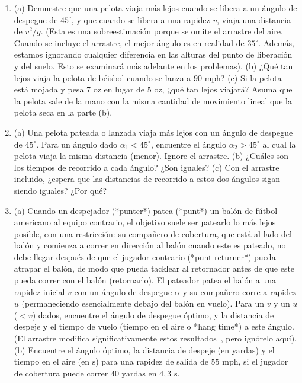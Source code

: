 \documentclass[12pt]{book}
\begin{document}
\begin{enumerate}
\item[3.93] (a) Demuestre que una pelota viaja más lejos cuando se libera a un ángulo de despegue de $45^\circ$, y que cuando se libera a una rapidez $v$, viaja una distancia de $v^2/g$. (Esta es una sobreestimación porque se omite el arrastre del aire. Cuando se incluye el arrastre, el mejor ángulo es en realidad de $35^\circ$. Además, estamos ignorando cualquier diferencia en las alturas del punto de liberación y del suelo. Esto se examinará más adelante en los problemas).
\newline
(b) ¿Qué tan lejos viaja la pelota de béisbol cuando se lanza a $90\text{ mph}$?
\newline
(c) Si la pelota está mojada y pesa $7\text{ oz}$ en lugar de $5\text{ oz}$, ¿qué tan lejos viajará? Asuma que la pelota sale de la mano con la misma cantidad de movimiento lineal que la pelota seca en la parte (b).

\item[3.94] (a) Una pelota pateada o lanzada viaja más lejos con un ángulo de despegue de $45^\circ$. Para un ángulo dado $\alpha_1 < 45^\circ$, encuentre el ángulo $\alpha_2 > 45^\circ$ al cual la pelota viaja la misma distancia (menor). Ignore el arrastre.
\newline
(b) ¿Cuáles son los tiempos de recorrido a cada ángulo? ¿Son iguales?
\newline
(c) Con el arrastre incluido, ¿espera que las distancias de recorrido a estos dos ángulos sigan siendo iguales? ¿Por qué?

\item[3.95] (a) Cuando un despejador (*punter*) patea (*punt*) un balón de fútbol americano al equipo contrario, el objetivo suele ser patearlo lo más lejos posible, con una restricción: su compañero de cobertura, que está al lado del balón y comienza a correr en dirección al balón cuando este es pateado, no debe llegar después de que el jugador contrario (*punt returner*) pueda atrapar el balón, de modo que pueda tacklear al retornador antes de que este pueda correr con el balón (retornarlo). El pateador patea el balón a una rapidez inicial $v$ con un ángulo de despegue $\alpha$ y su compañero corre a rapidez $u$ (permaneciendo esencialmente debajo del balón en vuelo). Para un $v$ y un $u$ ($< v$) dados, encuentre el ángulo de despegue óptimo, y la distancia de despeje y el tiempo de vuelo (tiempo en el aire o *hang time*) a este ángulo. (El arrastre modifica significativamente estos resultados~\cite{ref16}, pero ignórelo aquí).
\newline
(b) Encuentre el ángulo óptimo, la distancia de despeje (en yardas) y el tiempo en el aire (en $\text{s}$) para una rapidez de salida de $55\text{ mph}$, si el jugador de cobertura puede correr $40\text{ yardas}$ en $4{,}3\text{ s}$.


\end{enumerate}
\end{document}
